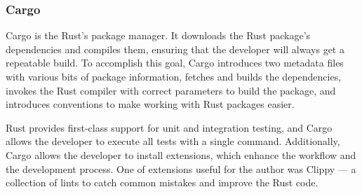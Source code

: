 \documentclass[english,bachelors,forcepolishlogotype]{wizthesis}
\newcommand{\paraphrase}[1]{#1}
\begin{document}
\subsubsection*{Cargo}

Cargo \cite{crates-io} is the Rust's package manager. \paraphrase{It downloads
the Rust package's dependencies and compiles them, ensuring that the developer
will always get a repeatable build. To accomplish this goal, Cargo introduces
two metadata files with various bits of package information, fetches and builds
the dependencies, invokes the Rust compiler with correct parameters to build the
package, and introduces conventions to make working with Rust packages easier.}

Rust provides first-class support for unit and integration testing, and Cargo
allows the developer to execute all tests with a single command. Additionally,
Cargo allows the developer to install extensions, which enhance the workflow and
the development process. One of extensions useful for the author was Clippy ---
a collection of lints to catch common mistakes and improve the Rust code.
\end{document}
